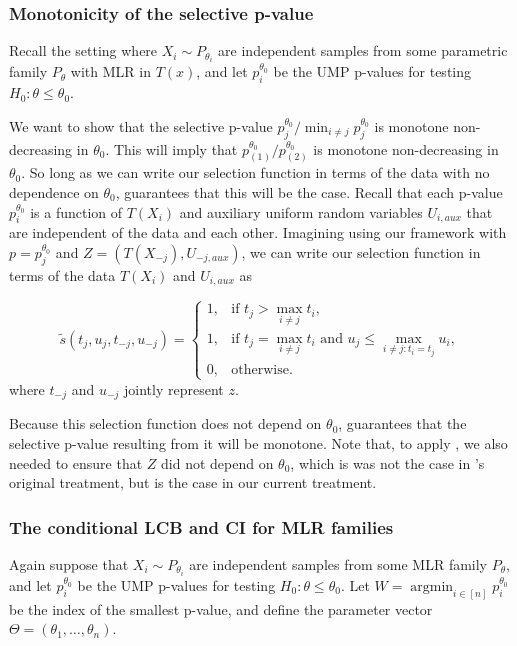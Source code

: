 \documentclass{article}
\DeclareMathOperator*{\argmin}{argmin}
\begin{document}
\begin{appendix}
\subsubsection{Monotonicity of the selective p-value}

Recall the setting where $X_i \sim P_{\theta_i}$ are independent samples from some parametric family $P_{\theta}$ with MLR in $T(x)$, and let $p^{\theta_0}_i$ be the UMP p-values for testing $H_0 : \theta \leq \theta_0$. 

We want to show that the selective p-value $p^{\theta_0}_j/\min_{i \neq j} p^{\theta_0}_j$ is monotone non-decreasing in $\theta_0$. This will imply that $p^{\theta_0}_{(1)}/p^{\theta_0}_{(2)}$ is monotone non-decreasing in $\theta_0$. So long as we can write our selection function in terms of the data with no dependence on $\theta_0$,  guarantees that this will be the case. Recall that each p-value $p^{\theta_0}_i$ is a function of $T(X_i)$ and auxiliary uniform random variables $U_{i, aux}$ that are independent of the data and each other. Imagining using our framework with $p=p^{\theta_0}_j$ and $Z=(T(X_{-j}), U_{-j, aux})$, we can write our selection function in terms of the data $T(X_i)$ and $U_{i, aux}$ as 

\begin{equation*}
    \tilde{s}(t_j, u_j, t_{-j}, u_{-j}) =
    \begin{cases} 
    1, & \text{if } t_j > \max_{i \neq j } t_i, \\
    1, & \text{if } t_j = \max_{i \neq j } t_i \text{ and } u_j \leq \max_{i \neq j : t_i = t_j} u_i, \\
    0, & \text{otherwise}.
\end{cases}
\end{equation*}
where $t_{-j}$ and $u_{-j}$ jointly represent $z$. 

Because this selection function does not depend on $\theta_0$,  guarantees that the selective p-value resulting from it will be monotone. Note that, to apply , we also needed to ensure that $Z$ did not depend on $\theta_0$, which is was not the case in 's original treatment, but is the case in our current treatment. 

\subsubsection{The conditional LCB and CI for MLR families}
Again suppose that $X_i \sim P_{\theta_i}$ are independent samples from some MLR family $P_{\theta}$, and let $p^{\theta_0}_i$ be the UMP p-values for testing $H_0 : \theta \leq \theta_0$. Let $W = \argmin_{i \in [n]} p^{\theta_0}_i$ be the index of the smallest p-value, and define the parameter vector $\Theta = (\theta_1, \dots, \theta_n)$. 


\end{appendix}
\end{document}
